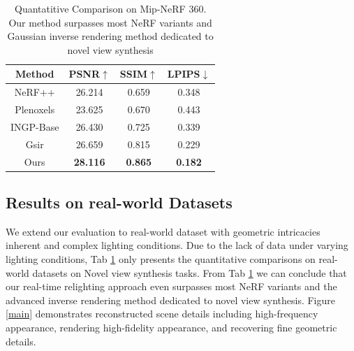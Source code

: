\begin{table}[htbp]
 \vspace{-0.3cm}
  \centering
      \caption{Quantatitive Comparison on Mip-NeRF 360. Our method surpasses most NeRF variants and Gaussian inverse rendering method dedicated to novel view synthesis}
    \begin{tabular}{c|ccc}
    \hline
     Method&PSNR$\uparrow$&SSIM$\uparrow$&LPIPS$\downarrow$\\
    \hline
     NeRF++& 26.214& 0.659 &0.348\\
    Plenoxels&  23.625& 0.670& 0.443\\
    INGP-Base&  26.430& 0.725 &0.339\\
    Gsir& 26.659 &0.815 &0.229\\
    Ours& \textbf{28.116}&\textbf{0.865}&\textbf{0.182}\\
    \hline
    \end{tabular}%
 \vspace{-0.7cm}
  \label{mip}%
\end{table}%


\subsection{Results on real-world Datasets}
We extend our evaluation to real-world dataset \cite{barron2022mipnerf360,jensen2014large} with geometric intricacies inherent and complex lighting conditions. Due to the lack of data under varying lighting conditions, Tab \ref{mip} only presents the quantitative comparisons on real-world datasets on Novel view synthesis tasks. From Tab \ref{mip} we can conclude that our real-time relighting approach even surpasses most NeRF variants and the advanced inverse rendering method dedicated to novel view synthesis. Figure \ref{main} demonstrates reconstructed scene details including high-frequency appearance, rendering high-fidelity appearance, and recovering fine geometric details.




